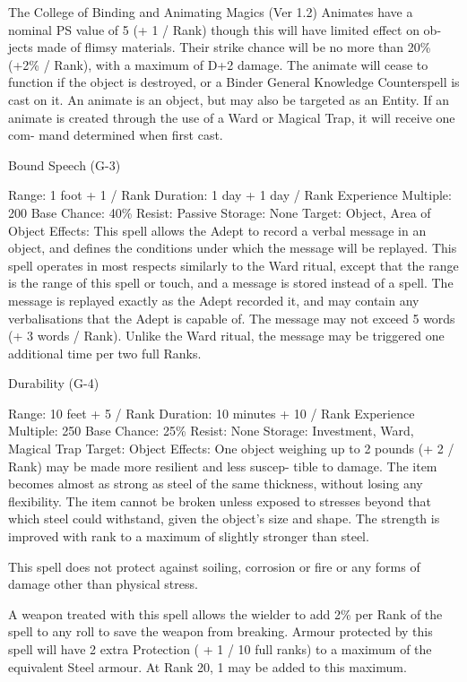 \begin{Chapter}{The College of Binding and Animating Magics (Ver 1.2)}
Animates  have  a  nominal  PS  value  of  5  (+  1  / 
Rank)  though  this  will  have  limited  effect  on  ob-
jects made of flimsy materials. Their strike chance 
will  be  no  more  than  20\%  (+2\%  /  Rank),  with  a 
maximum of D+2 damage. The animate will cease 
to  function  if  the  object  is  destroyed,  or  a  Binder 
General  Knowledge  Counterspell  is  cast  on  it.  An 
animate is an object, but may also be targeted as an 
Entity. If an animate is created through the use of a 
Ward  or  Magical  Trap,  it  will  receive  one  com-
mand determined when first cast. 

Bound Speech (G-3) 

Range: 1 foot + 1 / Rank 
Duration: 1 day + 1 day / Rank 
Experience Multiple: 200 
Base Chance: 40\% 
Resist: Passive 
Storage: None 
Target: Object, Area of Object 
Effects:  This  spell  allows  the  Adept  to  record  a 
verbal message in an object, and defines the conditions  under  which  the  message  will  be  replayed. 
This spell operates in most respects similarly to the 
Ward  ritual,  except  that  the  range  is  the  range  of 
this spell or touch, and a message is stored instead 
of  a  spell.  The  message  is  replayed  exactly  as  the 
Adept  recorded  it,  and  may  contain any  verbalisations  that  the  Adept  is  capable  of.  The  message 
may  not  exceed  5  words  (+  3  words  /  Rank). 
Unlike  the  Ward  ritual,  the  message  may  be  triggered one additional time per two full Ranks. 

Durability (G-4) 

Range: 10 feet + 5 / Rank 
Duration: 10 minutes + 10 / Rank 
Experience Multiple: 250 
Base Chance: 25\% 
Resist: None 
Storage: Investment, Ward, Magical Trap 
Target: Object 
Effects: One object weighing up to 2 pounds (+ 2 / 
Rank) may be made more resilient and less suscep-
tible  to  damage.  The  item  becomes  almost  as 
strong  as  steel  of  the  same  thickness,  without  losing  any  flexibility.  The  item  cannot  be  broken 
unless exposed to stresses beyond that which steel 
could withstand, given the object’s size and shape. 
The strength is improved with rank to a maximum 
of slightly stronger than steel. 

This  spell  does  not  protect  against  soiling,  corrosion  or  fire  or  any  forms  of  damage  other  than 
physical stress. 

A weapon treated with this spell allows the wielder 
to add 2\% per Rank of the spell to any roll to save 
the  weapon  from  breaking.  Armour  protected  by 
this spell will have 2 extra Protection ( + 1 / 10 full 
ranks)  to  a  maximum  of  the  equivalent  Steel  armour.  At  Rank  20,  1  may  be  added  to  this  maximum. 


\end{Chapter}

